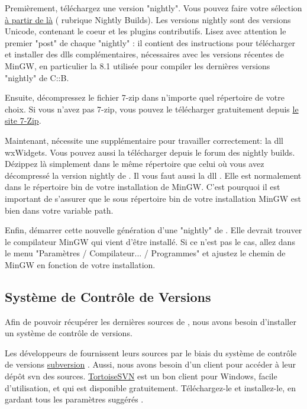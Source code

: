 Premièrement, téléchargez une version "nightly". Vous pouvez faire votre sélection \href{https://forums.codeblocks.org/}{à partir de là} (\cite{url:cbforum} rubrique Nightly Builds). Les versions nightly sont des versions Unicode, contenant le coeur et les plugins contributifs. Lisez avec attention le premier "post" de chaque "nightly" : il contient des instructions pour télécharger et installer des dlls complémentaires, nécessaires avec les versions récentes de MinGW, en particulier la 8.1 utilisée pour compiler les dernières versions "nightly" de C::B.

Ensuite, décompressez le fichier 7-zip \cite{url:zip} dans n'importe quel répertoire de votre choix. Si vous n'avez pas 7-zip, vous pouvez le télécharger gratuitement depuis \href{https://www.7-zip.org}{le site 7-Zip}.

Maintenant, \codeblocks nécessite une  supplémentaire pour travailler correctement: la dll wxWidgets. Vous pouvez aussi la télécharger depuis le forum des nightly builds. Dézippez là simplement dans le même répertoire que celui où vous avez décompressé la version nightly de \codeblocks . Il vous faut aussi la dll . Elle est normalement dans le répertoire bin de votre installation de MinGW. C'est pourquoi il est important de s'assurer que le sous répertoire bin de votre installation MinGW est bien dans votre variable path.

Enfin, démarrer cette nouvelle génération d'une "nightly" de \codeblocks. Elle devrait trouver le compilateur MinGW qui vient d'être installé. Si ce n'est pas le cas, allez dans le menu "Paramètres / Compilateur... / Programmes" et ajustez le chemin de MinGW en fonction de votre installation.

\subsection{Système de Contrôle de Versions}

Afin de pouvoir récupérer les dernières sources de \codeblocks, nous avons besoin d'installer un système de contrôle de versions.

Les développeurs de \codeblocks fournissent leurs sources par le biais du système de contrôle de versions \href{https://subversion.apache.org/}{subversion} \cite{url:subversion}. Aussi, nous avons besoin d'un client pour accéder à leur dépôt svn des sources. \href{https://tortoisesvn.net/}{TortoiseSVN} est un bon client pour Windows, facile d'utilisation, et qui est disponible gratuitement. Téléchargez-le et installez-le, en gardant tous les paramètres suggérés \cite{url:tortoisesvn}.

